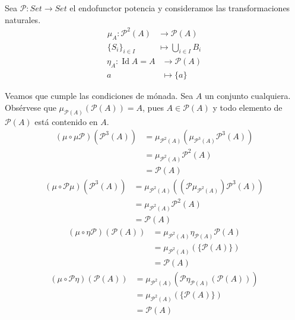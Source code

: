 \documentclass[12pt, twoside]{book}
\newcommand{\Set}{{Set}}
\DeclareMathOperator{\Id}{Id}
\begin{document}
\begin{example}
Sea $\mathcal{P} \colon \Set \to \Set$ el endofunctor potencia y consideramos las transformaciones naturales.
\begin{align*} \mu_A \colon \mathcal{P}^2(A) & \to \mathcal{P}(A)\\
\{S_i\}_{i \in I} & \mapsto \bigcup_{i \in I} B_i
\end{align*}
\begin{align*} \eta_A \colon \Id A = A & \to \mathcal{P}(A)\\
a & \mapsto \{a\}
\end{align*}

Veamos que cumple las condiciones de mónada. 
Sea $A$ un conjunto cualquiera.
Obsérvese que $\mu_{\mathcal{P}(A)}(\mathcal{P}(A)) = A$, pues $A \in \mathcal{P}(A)$ y todo elemento de $\mathcal{P}(A)$ está contenido en $A$.
\begin{align*}
(\mu \circ \mu \mathcal{P})(\mathcal{P}^3(A)) & = \mu_{\mathcal{P}^2(A)}\left(\mu_{\mathcal{P}^3(A)}\mathcal{P}^3(A)\right)\\
& = \mu_{\mathcal{P}^2(A)}\mathcal{P}^2(A)\\
& = \mathcal{P}(A)
\end{align*}
\begin{align*}
(\mu \circ \mathcal{P}\mu)(\mathcal{P}^3(A)) & = \mu_{\mathcal{P}^2(A)}\left((\mathcal{P}\mu_{\mathcal{P}^2(A)})\mathcal{P}^3(A)\right)\\
& = \mu_{\mathcal{P}^2(A)}\mathcal{P}^2(A)\\
& = \mathcal{P}(A)
\end{align*}
\begin{align*}
(\mu \circ \eta\mathcal{P})(\mathcal{P}(A)) & = \mu_{\mathcal{P}^2(A)}\eta_{\mathcal{P}(A)}\mathcal{P}(A)\\
& = \mu_{\mathcal{P}^2(A)}(\{\mathcal{P}(A)\})\\
& = \mathcal{P}(A)
\end{align*}
\begin{align*}
(\mu \circ \mathcal{P}\eta)(\mathcal{P}(A)) & = \mu_{\mathcal{P}^2(A)} \left(\mathcal{P}\eta_{\mathcal{P}(A)}(\mathcal{P}(A))\right)\\
& = \mu_{\mathcal{P}^2(A)} \left(\{\mathcal{P}(A)\}\right)\\
& = \mathcal{P}(A)
\end{align*}
\end{example}

\end{document}
